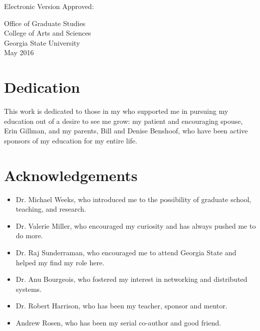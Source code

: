 \documentclass[12pt,letterpaper]{report}
\begin{document}
	
	\noindent
	Electronic Version Approved:\\
	\vspace{1cm}
	
	\noindent
	Office of Graduate Studies \\
	College of Arts and Sciences \\
	Georgia State University\\
	May 2016 
	
	
	
	
	\chapter*{Dedication}
	This work is dedicated to those in my who supported me in pursuing my education out of a desire to see me grow: my patient and encouraging spouse, Erin Gillman, and my parents, Bill and Denise Benshoof, who have been active sponsors of my education for my entire life.
	
	\chapter*{Acknowledgements}	

\begin{itemize}
\item	Dr. Michael Weeks, who introduced me to the possibility of graduate school, teaching, and research.
\item	Dr. Valerie Miller, who encouraged my curiosity and has always pushed me to do more. 
\item	Dr. Raj Sunderraman, who encouraged me to attend Georgia State and helped my find my role here.
\item	Dr. Anu Bourgeois, who fostered my interest in networking and distributed systems.
\item	Dr. Robert Harrison, who has been my teacher, sponsor and mentor.
\item   Andrew Rosen, who has been my serial co-author and good friend.
\end{itemize}
	
	\clearpage

	\setcounter{tocdepth}{0}
	\tableofcontents
	\clearpage



	\setcounter{tocdepth}{1}
	\listoftables
	\clearpage
	\listoffigures
	
	

	\clearpage	
	
	
	
	
	
	
	
	
	
	
	
\end{document}
